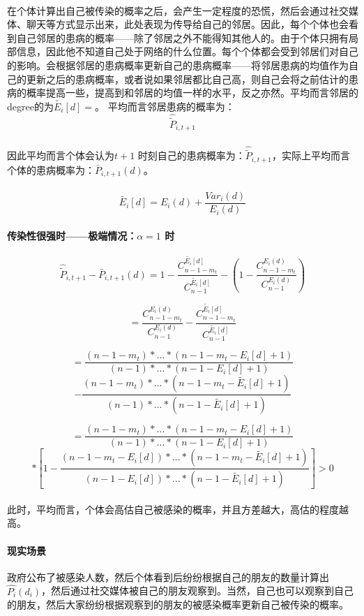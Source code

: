 \documentclass[a4paper]{article}
\begin{document}
\paragraph{}
在个体计算出自己被传染的概率之后，会产生一定程度的恐慌，然后会通过社交媒体、聊天等方式显示出来，此处表现为传导给自己的邻居。因此，每个个体也会看到自己邻居的患病的概率——除了邻居之外不能得知其他人的。由于个体只拥有局部信息，因此他不知道自己处于网络的什么位置。每个个体都会受到邻居们对自己的影响。会根据邻居的患病概率更新自己的患病概率——将邻居患病的均值作为自己的更新之后的患病概率，或者说如果邻居都比自己高，则自己会将之前估计的患病的概率提高一些，提高到和邻居的均值一样的水平，反之亦然。平均而言邻居的degree的为$\tilde{E_i}[d]=$。
平均而言邻居患病的概率为：
\[\hat{\tilde{P}}_{i,t+1}    \]

\paragraph{}
因此平均而言个体会认为$t+1$ 时刻自己的患病概率为：$\hat{\tilde{P}}_{i,t+1}$，实际上平均而言个体的患病概率为：$ \bar{P}_{i,t+1}(d)$。
\paragraph{}
\[ \tilde{E_i}[d]=E_i(d)+\frac{Var_i(d)  }{E_i(d)} \]
\paragraph{传染性很强时——极端情况：$\alpha=1$ 时 }
\[\hat{\tilde{P}}_{i,t+1}-  \bar{P}_{i,t+1}(d)=   1-\frac{C_{n-1-m_t}^{\tilde{E_i}[d]}} {C_{n-1}^{\tilde{E_i}[d]}} -( 1-\frac{C_{n-1-m_t}^{E_i(d)}} {C_{n-1}^{E_i(d)}}  )      \]

\[  =  \frac{C_{n-1-m_t}^{E_i(d)}} {C_{n-1}^{E_i(d)}}    -\frac{C_{n-1-m_t}^{\tilde{E_i}[d]}}{C_{n-1}^{\tilde{E_i}[d]}} \]

\[ =\frac{(n-1-m_t)*...*(n-1-m_t-E_i[d]+1)}{(n-1)*...*(n-1-E_i[d]+1)}   \] \[-\frac{(n-1-m_t)*...*(n-1-m_t-\tilde{E_i}[d]+1)}{(n-1)*...*(n-1-\tilde{E_i}[d]+1)}    \]

\[= \frac{(n-1-m_t)*...*(n-1-m_t-E_i[d]+1)}{(n-1)*...*(n-1-E_i[d]+1)}\]
\[ * [    1-   \frac{(n-1-m_t-E_i[d])*...*(n-1-m_t-\tilde{E_i}[d]+1  )  }{(n-1-E_i[d])*...*(n-1-\tilde{E_i}[d]+1  )}    ]  > 0  \]
\paragraph{}
此时，平均而言，个体会高估自己被感染的概率，并且方差越大，高估的程度越高。
\paragraph{现实场景}
政府公布了被感染人数，然后个体看到后纷纷根据自己的朋友的数量计算出$\hat{P_i}(d_i) $，然后通过社交媒体被自己的朋友观察到。当然，自己也可以观察到自己的朋友，然后大家纷纷根据观察到的朋友的被感染概率更新自己被传染的概率。
\end{document}
